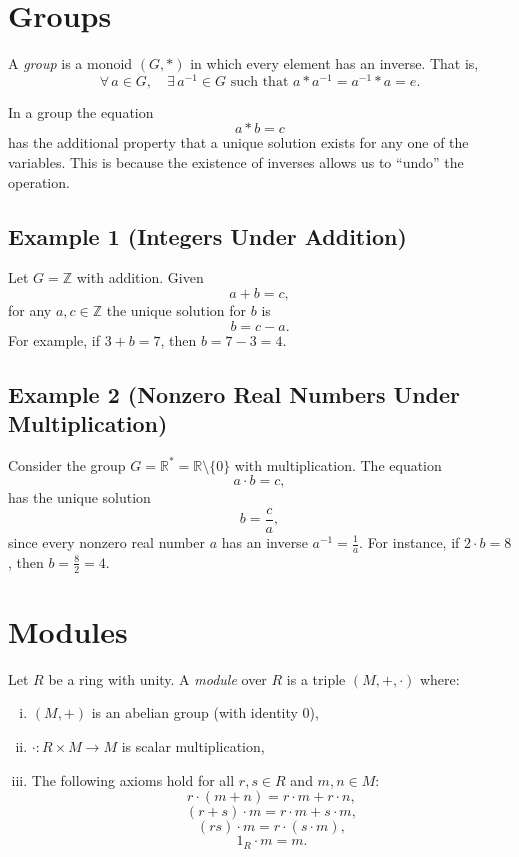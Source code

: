 \documentclass[11pt,openany]{article}
\begin{document}
\section{Groups}
\begin{definition}[Group]
	A \emph{group} is a monoid \((G,\ast)\) in which every element has an inverse. That is,
	\[
	\forall\, a \in G,\quad \exists\, a^{-1} \in G \text{ such that } a\ast a^{-1} = a^{-1}\ast a = e.
	\]
\end{definition}

In a group the equation
\[
a\ast b = c
\]
has the additional property that a unique solution exists for any one of the variables. This is because the existence of inverses allows us to “undo” the operation.

\subsection*{Example 1 (Integers Under Addition)}
Let \(G=\mathbb{Z}\) with addition. Given
\[
a+b = c,
\]
for any \(a,c\in \mathbb{Z}\) the unique solution for \(b\) is
\[
b=c-a.
\]
For example, if \(3+b=7\), then \(b=7-3=4\).

\subsection*{Example 2 (Nonzero Real Numbers Under Multiplication)}
Consider the group \(G=\mathbb{R}^*=\mathbb{R}\setminus\{0\}\) with multiplication. The equation
\[
a\cdot b = c,
\]
has the unique solution
\[
b = \frac{c}{a},
\]
since every nonzero real number \(a\) has an inverse \(a^{-1}=\frac{1}{a}\). For instance, if \(2\cdot b=8\), then \(b=\frac{8}{2}=4\).

\section{Modules}
\begin{definition}[Module]
	Let \(R\) be a ring with unity. A \emph{module} over \(R\) is a triple \((M, +, \cdot)\) where:
	\begin{enumerate}[(i)]
		\item \((M,+)\) is an abelian group (with identity \(0\)),
		\item \(\cdot : R \times M \to M\) is scalar multiplication,
		\item The following axioms hold for all \(r,s \in R\) and \(m,n \in M\):
		\[
		r\cdot(m+n)=r\cdot m + r\cdot n,
		\]
		\[
		(r+s)\cdot m = r\cdot m + s\cdot m,
		\]
		\[
		(rs)\cdot m = r\cdot(s\cdot m),
		\]
		\[
		1_R\cdot m = m.
		\]
	\end{enumerate}
\end{definition}
\end{document}
